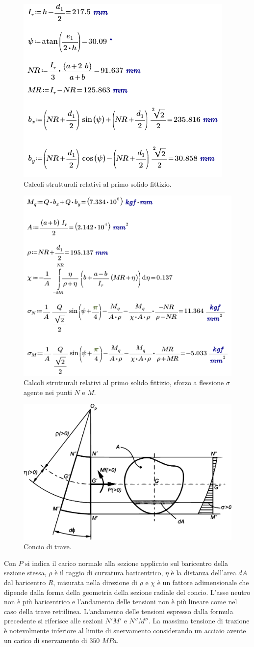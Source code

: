 \begin{figure}
\centering
  \includegraphics[width=.5\textwidth]{imgs/Mathcad1}
\caption{Calcoli strutturali relativi al primo solido fittizio.}
\label{fig:Mathcad1}
\end{figure}
\begin{figure}
\centering
  \includegraphics[width=.45\textwidth]{imgs/Mathcad2}
\caption{Calcoli strutturali relativi al primo solido fittizio, sforzo a flessione $\sigma$ agente nei punti $N$ e $M$.}
\label{fig:Mathcad2}
\end{figure}
\begin{figure}[H]
\centering
  \includegraphics[width=.5\textwidth]{imgs/Cap5/94 ConcioGC}
\caption{Concio di trave.}
\label{fig:ConcioGC}
\end{figure}

Con $P$ si indica il carico normale alla sezione applicato sul baricentro della sezione stessa, $\rho$ è il raggio di curvatura baricentrico, $\eta$ è la distanza dell'area $dA$ dal baricentro $R$, misurata nella direzione di $\rho$ e $\chi$ è un fattore adimensionale che dipende dalla forma della geometria della sezione radiale del concio.
L'asse neutro non è più baricentrico e l'andamento delle tensioni non è più lineare come nel caso della trave rettilinea. 
L'andamento delle tensioni espresso dalla formula precedente si riferisce alle sezioni $N'M'$ e $N''M''$. 
La massima tensione di trazione è notevolmente inferiore al limite di snervamento considerando un acciaio avente un carico di snervamento di $350$ $MPa$.

